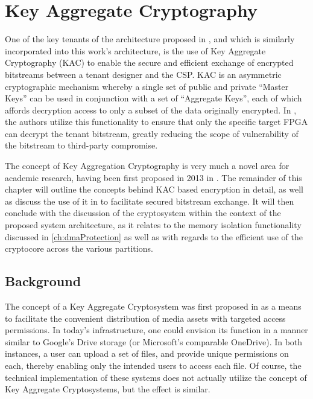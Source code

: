 
\chapter{Key Aggregate Cryptography}\label{ch:keyAggregateCryptography}
One of the key tenants of the architecture proposed in \cite{bag_cryptographically_2020}, and which is similarly incorporated into this work's architecture, is the use of Key Aggregate Cryptography (KAC) to enable the secure and efficient exchange of encrypted bitstreams between a tenant designer and the CSP. KAC is an asymmetric cryptographic mechanism whereby a single set of public and private ``Master Keys'' can be used in conjunction with a set of ``Aggregate Keys'', each of which affords decryption access to only a subset of the data originally encrypted. In \cite{bag_cryptographically_2020}, the authors utilize this functionality to ensure that only the specific target FPGA can decrypt the tenant bitstream, greatly reducing the scope of vulnerability of the bitstream to third-party compromise.

The concept of Key Aggregation Cryptography is very much a novel area for academic research, having been first proposed in 2013 in \cite{chu_key-aggregate_2014}. The remainder of this chapter will outline the concepts behind KAC based encryption in detail, as well as discuss the use of it in \cite{bag_cryptographically_2020} to facilitate secured bitstream exchange. It will then conclude with the discussion of the cryptosystem within the context of the proposed system architecture, as it relates to the memory isolation functionality discussed in \ref{ch:dmaProtection} as well as with regards to the efficient use of the cryptocore across the various partitions.

\section{Background}\label{sec:KACBackground}
The concept of a Key Aggregate Cryptosystem was first proposed in \cite{chu_key-aggregate_2014} as a means to facilitate the convenient distribution of media assets with targeted access permissions. In today's infrastructure, one could envision its function in a manner similar to Google's Drive storage (or Microsoft's comparable OneDrive). In both instances, a user can upload a set of files, and provide unique permissions on each, thereby enabling only the intended users to access each file. Of course, the technical implementation of these systems does not actually utilize the concept of Key Aggregate Cryptosystems, but the effect is similar.

